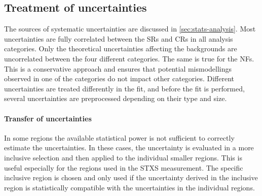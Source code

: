 \subsection{Treatment of uncertainties}
The sources of systematic uncertainties are discussed in \cref{sec:stats-analysis}. 
Most uncertainties are fully correlated between the SRs and CRs in all analysis categories. Only the theoretical uncertainties affecting the backgrounds are uncorrelated between the four different categories. The same is true for the NFs. This is a conservative approach and ensures that potential mismodellings observed in one of the categories do not impact other categories. 
Different uncertainties are treated differently in the fit, and before the fit is performed, several uncertainties are preprocessed depending on their type and size. 

\paragraph{Transfer of uncertainties}
In some regions the available statistical power is not sufficient to correctly estimate the uncertainties. 
In these cases, the uncertainty is evaluated in a more inclusive selection and then applied to the individual smaller regions. This is useful especially for the regions used in the STXS measurement. The specific inclusive region is chosen and only used if the uncertainty derived in the inclusive region is statistically compatible with the uncertainties in the individual regions. 

